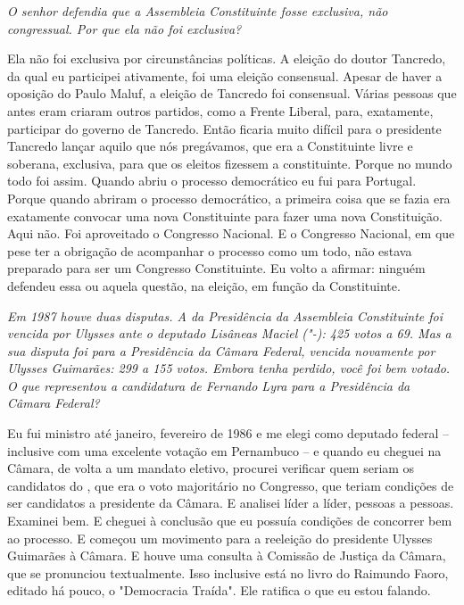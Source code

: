\medskip

\noindent\emph{O senhor defendia que a Assembleia Constituinte fosse exclusiva,
não congressual. Por que ela não foi exclusiva?}

Ela não foi exclusiva por circunstâncias políticas. A
eleição do doutor Tancredo, da qual eu participei ativamente, foi uma
eleição consensual. Apesar de haver a oposição do Paulo Maluf, a eleição
de Tancredo foi consensual. Várias pessoas que antes eram  criaram
outros partidos, como a Frente Liberal, para, exatamente, participar do
governo de Tancredo. Então ficaria muito difícil para o presidente
Tancredo lançar aquilo que nós pregávamos, que era a Constituinte livre
e soberana, exclusiva, para que os eleitos fizessem a constituinte.
Porque no mundo todo foi assim. Quando abriu o processo democrático eu
fui para Portugal. Porque quando abriram o processo democrático, a
primeira coisa que se fazia era exatamente convocar uma nova
Constituinte para fazer uma nova Constituição. Aqui não. Foi aproveitado
o Congresso Nacional. E o Congresso Nacional, em que pese ter a
obrigação de acompanhar o processo como um todo, não estava preparado
para ser um Congresso Constituinte. Eu volto a afirmar: ninguém defendeu
essa ou aquela questão, na eleição, em função da Constituinte.

\medskip

\noindent\emph{Em 1987 houve duas disputas. A da Presidência da Assembleia
Constituinte foi vencida por Ulysses ante o deputado Lisâneas Maciel
("-): 425 votos a 69. Mas a sua disputa foi para a Presidência da
Câmara Federal, vencida novamente por Ulysses Guimarães: 299 a 155
votos. Embora tenha perdido, você foi bem votado. O que representou a
candidatura de Fernando Lyra para a Presidência da Câmara Federal?}

Eu fui ministro até janeiro, fevereiro de 1986 e me elegi
como deputado federal -- inclusive com uma excelente votação em
Pernambuco -- e quando eu cheguei na Câmara, de volta a um mandato
eletivo, procurei verificar quem seriam os candidatos do , que era o
voto majoritário no Congresso, que teriam condições de ser candidatos a
presidente da Câmara. E analisei líder a líder, pessoas a pessoas.
Examinei bem. E cheguei à conclusão que eu possuía condições de
concorrer bem ao processo. E começou um movimento para a reeleição do
presidente Ulysses Guimarães à Câmara. E houve uma consulta à Comissão
de Justiça da Câmara, que se pronunciou textualmente. Isso inclusive
está no livro do Raimundo Faoro, editado há pouco, o "Democracia
Traída". Ele ratifica o que eu estou falando.


